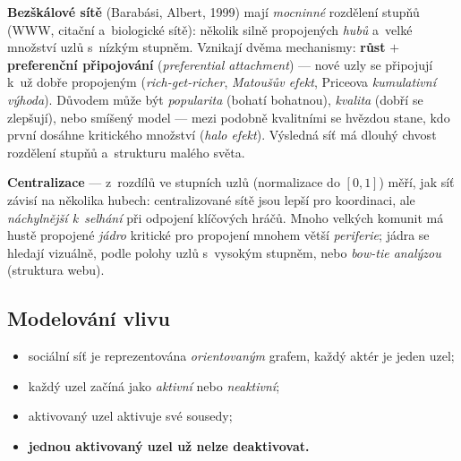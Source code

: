 \documentclass[11pt,a4paper]{article}
\theoremstyle{definition}
\begin{document}
\begin{defbox}
\textbf{Bezškálové sítě} (Barabási, Albert, 1999) mají \emph{mocninné} rozdělení stupňů
(WWW, citační a~biologické sítě): několik silně propojených \emph{hubů} a~velké množství
uzlů s~nízkým stupněm. Vznikají dvěma mechanismy: \textbf{růst} $+$ \textbf{preferenční
připojování} (\emph{preferential attachment}) --- nové uzly se připojují k~už dobře
propojeným (\emph{rich-get-richer}, \emph{Matoušův efekt}, Priceova \emph{kumulativní
výhoda}). Důvodem může být \emph{popularita} (bohatí bohatnou), \emph{kvalita} (dobří se
zlepšují), nebo smíšený model --- mezi podobně kvalitními se hvězdou stane, kdo první
dosáhne kritického množství (\emph{halo efekt}). Výsledná síť má dlouhý chvost rozdělení
stupňů a~strukturu malého světa.
\end{defbox}

\begin{defbox}
\textbf{Centralizace} --- z~rozdílů ve stupních uzlů (normalizace do $[0,1]$) měří, jak síť
závisí na několika hubech: centralizované sítě jsou lepší pro koordinaci, ale
\emph{náchylnější k~selhání} při odpojení klíčových hráčů. Mnoho velkých komunit má hustě
propojené \emph{jádro} kritické pro propojení mnohem větší \emph{periferie}; jádra se hledají
vizuálně, podle polohy uzlů s~vysokým stupněm, nebo \emph{bow-tie analýzou} (struktura webu).
\end{defbox}

\subsection{Modelování vlivu}

\begin{defbox}
\begin{itemize}
\item sociální síť je reprezentována \emph{orientovaným} grafem, každý aktér je jeden uzel;
\item každý uzel začíná jako \emph{aktivní} nebo \emph{neaktivní};
\item aktivovaný uzel aktivuje své sousedy;
\item \textbf{jednou aktivovaný uzel už nelze deaktivovat.}
\end{itemize}
\end{defbox}
\end{document}
